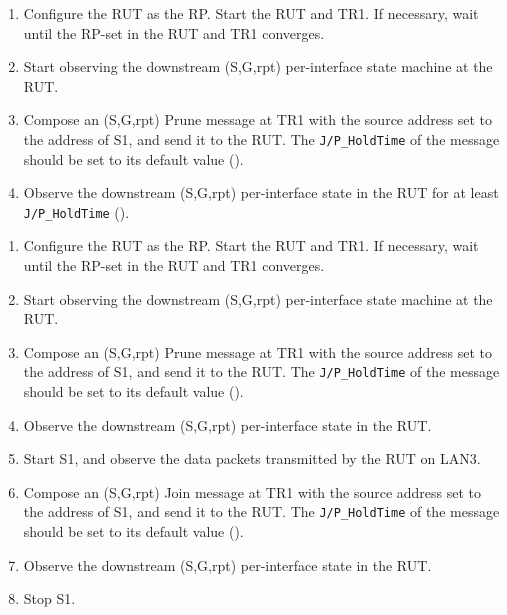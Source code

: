 \documentclass[11pt]{report}
\begin{document}

\begin{enumerate}

  \item Configure the RUT as the RP. Start the RUT and TR1. If
  necessary, wait until the RP-set in the RUT and TR1 converges.

  \item Start observing the downstream (S,G,rpt) per-interface state
  machine at the RUT.

  \item Compose an (S,G,rpt) Prune message at TR1 with the source address set
  to the address of S1, and send it to the RUT.
  The \verb=J/P_HoldTime= of the message should be set to its default
  value ({\PimsmJPHoldTime}).

  \item Observe the downstream (S,G,rpt) per-interface state in the RUT
  for at least \verb=J/P_HoldTime= ({\PimsmJPHoldTime}).

\end{enumerate}


\begin{enumerate}

  \item Configure the RUT as the RP. Start the RUT and TR1. If
  necessary, wait until the RP-set in the RUT and TR1 converges.

  \item Start observing the downstream (S,G,rpt) per-interface state
  machine at the RUT.

  \item Compose an (S,G,rpt) Prune message at TR1 with the source address set
  to the address of S1, and send it to the RUT.
  The \verb=J/P_HoldTime= of the message should be set to its default
  value ({\PimsmJPHoldTime}).

  \item Observe the downstream (S,G,rpt) per-interface state in the RUT.

  \item Start S1, and observe the data packets transmitted by the RUT on
  LAN3.

  \item Compose an (S,G,rpt) Join message at TR1 with the source address set
  to the address of S1, and send it to the RUT.
  The \verb=J/P_HoldTime= of the message should be set to its default
  value ({\PimsmJPHoldTime}).

  \item Observe the downstream (S,G,rpt) per-interface state in the RUT.

  \item Stop S1.

\end{enumerate}
\end{document}
